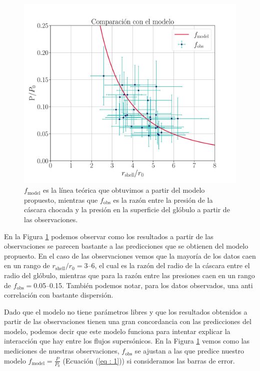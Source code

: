 \documentclass{book}
\begin{document}
\begin{figure}[htb]
    \centering
    \includegraphics[width=\textwidth]{imagenes_corregidas/Model.pdf}
    \caption{$f_\mathrm{model}$ es la línea teórica que obtuvimos a partir del modelo propuesto, mientras que $f_\mathrm{obs}$ es la razón entre la presión de la cáscara chocada  y la presión en la superficie del glóbulo a partir de las observaciones.}
    \label{Resultados_modelo}
\end{figure}

En la Figura \ref{Resultados_modelo} podemos observar como los resultados a partir de las observaciones se parecen bastante a las predicciones que se obtienen del modelo propuesto. En el caso de las observaciones vemos que la mayoría de los datos caen en un  rango de $r_\mathrm{shell}/r_0=$3--6, el cual es la razón del radio de la cáscara entre el radio del glóbulo, mientras que para la razón entre las presiones caen en un rango de $f_\mathrm{obs}=$0.05--0.15. También podemos notar, para los datos observados, una anti correlación con bastante dispersión.

Dado que el modelo no tiene parámetros libres y que los resultados obtenidos a partir de las observaciones tienen una gran concordancia con las predicciones del modelo, podemos decir que este modelo funciona para intentar explicar la interacción que hay entre los flujos supersónicos. En la Figura \ref{Resultados_modelo} vemos como las mediciones de nuestras observaciones, $f_\mathrm{obs}$ se ajustan a las que predice nuestro modelo $f_\mathrm{model}=\frac{P}{P_0}$ (Ecuación (\ref{eq : 1})) si consideramos las barras de error.
\end{document}
